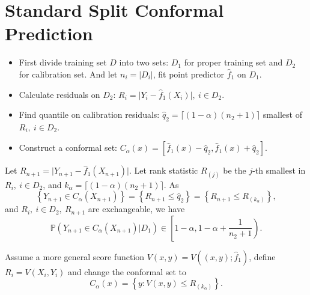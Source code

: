 \documentclass[12pt, a4paper, oneside]{article}
\begin{document}
\section{Standard Split Conformal Prediction}
    \begin{itemize}
        \item First divide training set $D$ into two sets: $D_1$ for proper training set and $D_2$ for calibration set. And let $n_i=|D_i|$, fit point predictor $\hat{f}_1$ on $D_1$.
        \item Calculate residuals on $D_2$: $R_i=\Big|Y_i-\hat{f}_1(X_i)\Big|,\ i\in D_2$.
        \item Find quantile on calibration residuals: $\hat{q}_2=\lceil (1-\alpha)(n_2+1)\rceil$ smallest of $R_i,\ i\in D_2$.
        \item Construct a conformal set: $C_\alpha(x)=\left[ \hat{f}_1(x)-\hat{q}_2,\hat{f}_1(x)+\hat{q}_2 \right]$.
    \end{itemize}


    Let $R_{n+1}=\Big|Y_{n+1}-\hat{f}_1(X_{n+1})\Big|$. Let rank statistic $R_{(j)}$ be the $j$-th smallest in $R_i,\ i\in D_2$, and $k_\alpha=\lceil (1-\alpha)(n_2+1)\rceil$. As
    \begin{equation*}
        \left\{ Y_{n+1}\in C_\alpha(X_{n+1}) \right\}=\left\{ R_{n+1}\leq\hat{q}_2 \right\}=\left\{ R_{n+1}\leq R_{(k_\alpha)} \right\},
    \end{equation*}
    and $R_i,\ i\in D_2,\ R_{n+1}$ are exchangeable, we have
    \begin{equation*}
        \mathbb{P}\left( Y_{n+1}\in C_\alpha(X_{n+1})\Big|D_1 \right)\in\left[ 1-\alpha,1-\alpha+\dfrac{1}{n_2+1} \right).
    \end{equation*}


    Assume a more general score function $V(x,y)=V((x,y);\hat{f}_1)$, define $R_i=V(X_i,Y_i)$ and change the conformal set to
    \begin{equation*}
        C_\alpha(x)=\left\{ y:V(x,y)\leq R_{(k_\alpha)} \right\}.
    \end{equation*}
\end{document}
